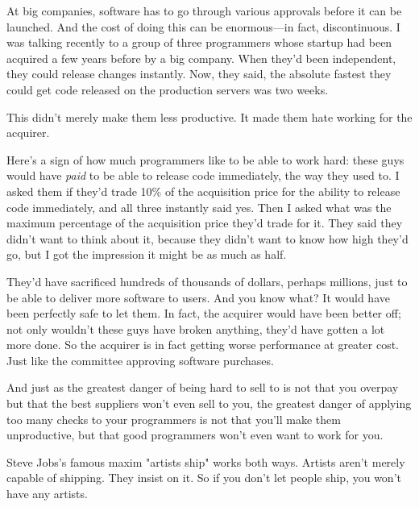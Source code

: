 At big companies, software has to go through
                  various approvals before it can be launched. And the cost of
                  doing this can be enormous---in fact, discontinuous. I was
                  talking recently to a group of three programmers whose startup
                  had been acquired a few years before by a big company. When
                  they'd been independent, they could release changes instantly.
                  Now, they said, the absolute fastest they could get code
                  released on the production servers was two weeks.

This
                  didn't merely make them less productive. It made them hate
                  working for the acquirer.

Here's a sign of how much
                  programmers like to be able to work hard: these guys would
                  have \emph{paid} to be able to release code immediately, the
                  way they used to. I asked them if they'd trade 10\% of the
                  acquisition price for the ability to release code immediately,
                  and all three instantly said yes. Then I asked what was the
                  maximum percentage of the acquisition price they'd trade for
                  it. They said they didn't want to think about it, because they
                  didn't want to know how high they'd go, but I got the
                  impression it might be as much as half.

They'd have
                  sacrificed hundreds of thousands of dollars, perhaps millions,
                  just to be able to deliver more software to users. And you
                  know what? It would have been perfectly safe to let them. In
                  fact, the acquirer would have been better off; not only
                  wouldn't these guys have broken anything, they'd have gotten a
                  lot more done. So the acquirer is in fact getting worse
                  performance at greater cost. Just like the committee approving
                  software purchases.

And just as the greatest danger
                  of being hard to sell to is not that you overpay but that the
                  best suppliers won't even sell to you, the greatest danger of
                  applying too many checks to your programmers is not that
                  you'll make them unproductive, but that good programmers won't
                  even want to work for you.

Steve Jobs's famous
                  maxim "artists ship" works both ways. Artists aren't merely
                  capable of shipping. They insist on it. So if you don't let
                  people ship, you won't have any artists.


              
            
          
            
              
                


                  
              
            
          
